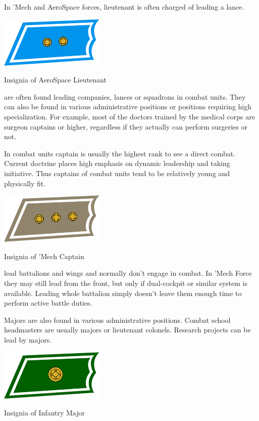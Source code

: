 \documentclass{tufte-book}
\begin{document}
In 'Mech and AeroSpace forces, lieutenant is often charged of leading a
lance.

\begin{marginfigure}[0\baselineskip]
  \includegraphics[width=5.0cm]{rank-lieutenant}
  \caption{Insignia of AeroSpace Lieutenant}
  \label{fig:insignia_lieutenant}
\end{marginfigure}

 are often found leading companies, lances or squadrons
in combat units. They can also be found in various administrative positions or
positions requiring high specialization. For example, most of the doctors
trained by the medical corps are surgeon captains or higher, regardless if
they actually can perform surgeries or not.

In combat units captain is usually the highest rank to see a direct combat.
Current doctrine places high emphasis on dynamic leadership and taking
initiative. Thus captains of combat units tend to be relatively young and
physically fit.

\begin{marginfigure}[0\baselineskip]
  \includegraphics[width=5.0cm]{rank-captain}
  \caption{Insignia of 'Mech Captain}
  \label{fig:insignia_captain}
\end{marginfigure}

 lead battalions and wings and normally don't engage in
combat. In 'Mech Force they may still lead from the front, but only if
dual-cockpit or similar system is available. Leading whole battalion simply
doesn't leave them enough time to perform active battle duties.

Majors are also found in various administrative positions. Combat school
headmasters are usually majors or lieutenant colonels. Research projects
can be lead by majors.

\begin{marginfigure}[0\baselineskip]
  \includegraphics[width=5.0cm]{rank-major}
  \caption{Insignia of Infantry Major}
  \label{fig:insignia_major}
\end{marginfigure}
\end{document}
